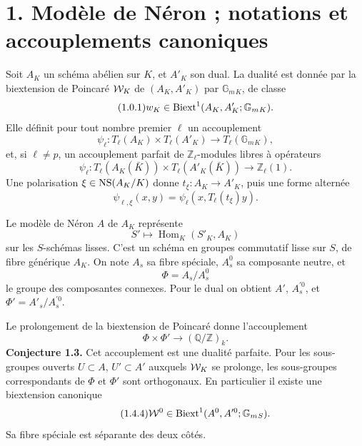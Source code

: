 \documentclass[11pt]{article}
\providecommand{\Z}{\mathbb Z}
\providecommand{\Q}{\mathbb Q}
\providecommand{\Gm}{\mathbb G_m}
\providecommand{\Hom}{\operatorname{Hom}}
\begin{document}
\section*{1. Mod\`ele de N\'eron ; notations et accouplements canoniques}
Soit \(A_K\) un sch\'ema ab\'elien sur \(K\), et \(A'_K\) son dual.  La dualit\'e est donn\'ee par la biextension de Poincar\'e \(\mathcal W_K\) de \((A_K,A'_K)\) par \(\Gm{}_K\), de classe
\begin{equation}\tag{1.0.1}
 w_K\in \Biext^1(A_K,A'_K;\Gm{}_K).
\end{equation}
Elle d\'efinit pour tout nombre premier \(\ell\) un accouplement
\begin{equation}\tag{1.0.2}
 \psi_\ell:T_\ell(A_K)\times T_\ell(A'_K)\longrightarrow T_\ell(\Gm{}_K),
\end{equation}
et, si \(\ell\ne p\), un accouplement parfait de \(\Z_\ell\)-modules libres \`a op\'erateurs
\begin{equation}\tag{1.0.3}
 \psi_\ell:T_\ell(A_K(\bar K))\times T_\ell(A'_K(\bar K))\longrightarrow \Z_\ell(1).
\end{equation}
Une polarisation \(\xi\in\operatorname{NS}(A_K/K)\) donne \(t_\xi:A_K\to A'_K\), puis une forme altern\'ee
\begin{equation}\tag{1.0.7}
 \psi_{\ell,\xi}(x,y)=\psi_\ell(x,T_\ell(t_\xi)y).
\end{equation}

Le mod\`ele de N\'eron \(A\) de \(A_K\) repr\'esente
\begin{equation}\tag{1.1.1}
 S'\longmapsto\Hom_K(S'_K,A_K)
\end{equation}
sur les \(S\)-sch\'emas lisses.  C'est un sch\'ema en groupes commutatif lisse sur \(S\), de fibre g\'en\'erique \(A_K\).  On note \(A_s\) sa fibre sp\'eciale, \(A_s^0\) sa composante neutre, et
\begin{equation}\tag{1.1.5}
 \Phi=A_s/A_s^0
\end{equation}
le groupe des composantes connexes.  Pour le dual on obtient \(A'\), \(A_s^{\prime 0}\), et \(\Phi'=A'_s/A_s^{\prime 0}\).

Le prolongement de la biextension de Poincar\'e donne l'accouplement
\begin{equation}\tag{1.2.1}
 \Phi\times\Phi'\longrightarrow (\Q/\Z)_k.
\end{equation}
\textbf{Conjecture 1.3.}  Cet accouplement est une dualit\'e parfaite.
Pour les sous-groupes ouverts \(U\subset A\), \(U'\subset A'\) auxquels \(\mathcal W_K\) se prolonge, les sous-groupes correspondants de \(\Phi\) et \(\Phi'\) sont orthogonaux.  En particulier il existe une biextension canonique
\begin{equation}\tag{1.4.4}
 \cW^0\in\Biext^1(A^0,A^{\prime 0};\Gm{}_S).
\end{equation}
Sa fibre sp\'eciale est s\'eparante des deux c\^ot\'es.
\end{document}
